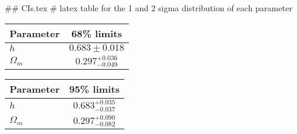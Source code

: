 ## CIs.tex
# latex table for the 1 and 2 sigma distribution of each parameter

\begin{tabular} { l  c}
 Parameter &  68\% limits\\
\hline
{\boldmath$h              $} & $0.683\pm 0.018            $\\
{\boldmath$\Omega_m       $} & $0.297^{+0.036}_{-0.049}   $\\
\hline
\end{tabular}

\begin{tabular} { l  c}
 Parameter &  95\% limits\\
\hline
{\boldmath$h              $} & $0.683^{+0.035}_{-0.037}   $\\
{\boldmath$\Omega_m       $} & $0.297^{+0.090}_{-0.082}   $\\
\hline
\end{tabular}
